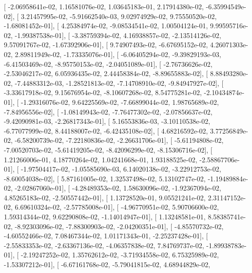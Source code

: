 \documentclass{article}
\begin{document}
       [ -2.06958641e-02,   1.16581076e-02,   1.03645183e-01,
          2.17914380e-02,  -6.35994549e-02],
       [  3.21457995e-02,  -5.91662540e-03,   9.02974929e-02,
          9.75550520e-02,  -1.68081452e-01],
       [  4.25384974e-02,  -9.08534541e-02,   1.00504124e-01,
          9.99595716e-02,  -1.99387538e-01],
       [ -3.38759394e-02,   4.16938857e-02,  -2.13514126e-02,
          9.57091767e-02,  -1.67392906e-01],
       [  9.74907493e-02,  -6.67695152e-02,   4.26071303e-02,
          2.89811949e-02,  -1.73335076e-01],
       [ -6.06405294e-02,  -9.39829193e-03,  -6.41503469e-02,
         -8.95750153e-02,  -2.04051089e-01],
       [ -2.76736626e-02,  -2.53046217e-02,   6.05936435e-02,
          2.44458384e-02,  -8.89655883e-02],
       [  8.88493280e-02,  -7.44883312e-03,  -1.28521813e-02,
         -7.14708910e-02,  -9.84947927e-02],
       [ -3.33617918e-02,   9.15676954e-02,  -8.10607268e-02,
          8.54775281e-02,  -2.10434874e-01],
       [ -1.29316076e-02,   9.64225569e-02,  -7.66899044e-02,
          1.98765689e-02,  -7.84956556e-02],
       [ -1.08149943e-02,  -7.76477302e-02,  -2.07856637e-02,
         -9.42090981e-03,  -2.26817343e-01],
       [  5.16553836e-03,  -3.10110538e-02,  -6.77077999e-02,
          8.44188007e-02,  -6.42435108e-02],
       [  4.68216592e-02,   3.77256849e-02,  -6.58200739e-02,
         -7.22180836e-02,  -2.26631706e-01],
       [ -5.61194808e-02,  -7.00520703e-02,  -5.61419205e-02,
         -8.42096299e-02,  -8.15306716e-02],
       [  1.21266006e-01,   4.18770264e-02,   1.04241668e-01,
          1.93188525e-02,  -2.58867706e-01],
       [ -1.97504417e-02,  -1.05585690e-03,   6.14020138e-02,
         -3.22912753e-02,  -8.60054038e-02],
       [  5.87161005e-02,   1.32537498e-02,   5.13102747e-02,
         -1.19489884e-02,  -2.02867060e-01],
       [ -4.28489353e-02,   1.58630096e-02,  -1.92367094e-02,
          4.85265183e-02,  -2.50557442e-01],
       [  1.13728520e-01,   9.05521241e-02,   2.31147152e-02,
          6.69610324e-02,  -2.57785008e-01],
       [ -4.96770951e-02,   5.90706600e-02,   1.59314344e-02,
          9.62290808e-02,  -1.14014947e-01],
       [  1.13248581e-01,   8.58385741e-02,  -8.92303096e-02,
         -7.88300903e-02,  -2.04200351e-01],
       [ -4.85570732e-02,  -4.60552466e-02,   7.08467344e-02,
          1.01171343e-01,  -2.25237428e-01],
       [ -2.55833353e-02,  -2.63367136e-02,  -4.06357838e-02,
          7.84769737e-02,  -1.89938783e-01],
       [ -2.19247252e-02,   1.35762612e-02,  -3.71934558e-02,
          6.75325989e-02,  -1.53307212e-01],
       [ -6.67161768e-02,  -5.79041815e-02,   4.68944829e-02,
\end{document}
